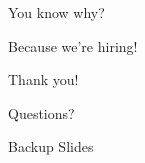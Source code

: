 \documentclass{beamer}
\begin{document}
  \begin{frame}[standout]
    \begin{center}
      You know why?
    \end{center}
  \end{frame}

  {
    \begin{frame}[standout]
      \paperheight
      \color{black}
      \alert{Because we're hiring!}
    \end{frame}
  }

  \begin{frame}[standout]
    \begin{center}
      Thank you!

      Questions?
    \end{center}
  \end{frame}


  \appendix
  \begin{frame}[standout]
    Backup Slides
  \end{frame}
\end{document}
